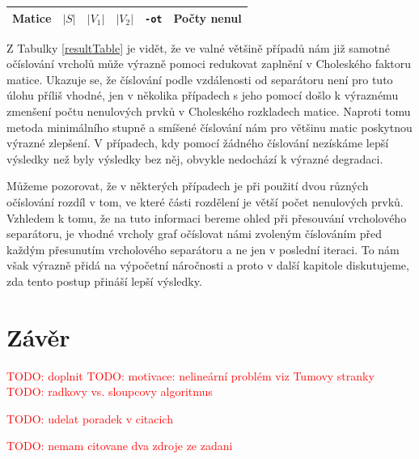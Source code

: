 \documentclass[11pt,american,czech,oneside]{book}
\theoremstyle{plain}
\theoremstyle{definition}
\newcommand{\TODO}[1]{\textcolor{red}{TODO: #1}}
\begin{document}
\bigskip
{\noindent
\footnotesize
  \centering
  \renewcommand{\arraystretch}{1.15}
\begin{longtable}{|l|c|c|c|r|r|r|}
  \hline
  \multicolumn{1}{|c|}{Matice} & \multicolumn{1}{|c|}{$|S|$}    &\multicolumn{1}{|c|}{$|V_1|$} &\multicolumn{1}{|c|}{$|V_2|$} & \multicolumn{1}{|c|}{\texttt{-ot}} & \multicolumn{2}{c|}{Počty nenul} \\
  \hline
  
  \hline
\end{longtable}
\captionof{table}{\TODO{dopsat} \label{resultTable}}
}

Z Tabulky \ref{resultTable} je vidět, že ve valné většině případů nám již samotné očíslování vrcholů může výrazně pomoci redukovat zaplnění v Choleského faktoru matice. Ukazuje se, že číslování podle vzdálenosti od separátoru není pro tuto úlohu příliš vhodné, jen v několika případech s jeho pomocí došlo k výraznému zmenšení počtu nenulových prvků v Choleského rozkladech matice. Naproti tomu metoda minimálního stupně a smíšené číslování nám pro většinu matic poskytnou výrazné zlepšení. V případech, kdy pomocí žádného číslování nezískáme lepší výsledky než byly výsledky bez něj, obvykle nedochází k výrazné degradaci.

Můžeme pozorovat, že v některých případech je při použití dvou různých očíslování rozdíl v tom, ve které části rozdělení je větší počet nenulových prvků. Vzhledem k tomu, že na tuto informaci bereme ohled při přesouvání vrcholového separátoru, je vhodné vrcholy graf očíslovat námi zvoleným číslováním před každým přesunutím vrcholového separátoru a ne jen v poslední iteraci. To nám však výrazně přidá na výpočetní náročnosti a proto v další kapitole diskutujeme, zda tento postup přináší lepší výsledky.


\chapter*{Závěr}
\TODO{doplnit}
\TODO{motivace: nelineární problém viz Tumovy stranky}
\TODO{radkovy vs. sloupcovy algoritmus}


\newpage



\TODO{udelat poradek v citacich}

\TODO{nemam citovane dva zdroje ze zadani}
\end{document}
